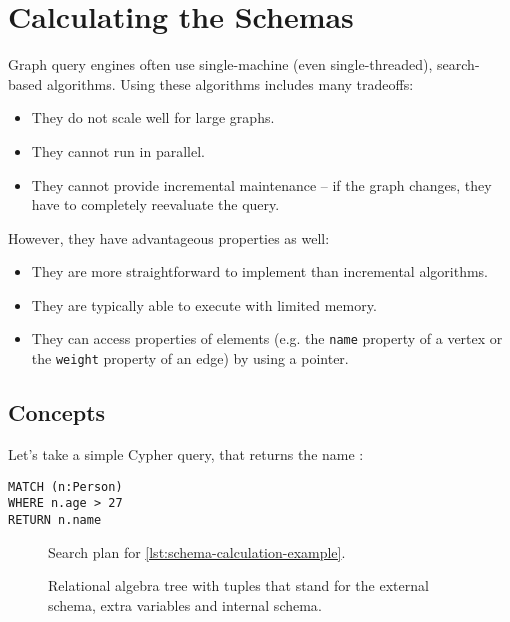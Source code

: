\chapter{Calculating the Schemas}

Graph query engines often use single-machine (even single-threaded), search-based algorithms. Using these algorithms includes many tradeoffs:

\begin{itemize}
	\item They do not scale well for large graphs.
	\item They cannot run in parallel.
	\item They cannot provide incremental maintenance -- if the graph changes, they have to completely reevaluate the query.
\end{itemize}

However, they have advantageous properties as well:

\begin{itemize}
	\item They are more straightforward to implement than incremental algorithms.
	\item They are typically able to execute with limited memory.
	\item They can access properties of elements (e.g. the \texttt{name} property of a vertex or the \texttt{weight} property of an edge) by using a pointer.
\end{itemize}

\section{Concepts}

Let's take a simple Cypher query, that returns the name :

\begin{lstlisting}[label=lst:schema-calculation-example, caption=Example query]
MATCH (n:Person)
WHERE n.age > 27
RETURN n.name
\end{lstlisting}

\newcommand{\screenshotscale}{0.45}

\begin{figure}
	\centering
	
	\caption{Search plan for \autoref{lst:schema-calculation-example}.}
	\label{fig:neo4-query-plan}
\end{figure}

\begin{figure}
	\centering
	
	\caption{Relational algebra tree with tuples that stand for the \textcolor{externalschemacolor}{external schema}, \textcolor{extravariablescolor}{extra variables} and \textcolor{internalschemacolor}{internal schema}.}
	\label{fig:example-schema-calculation}
\end{figure}

